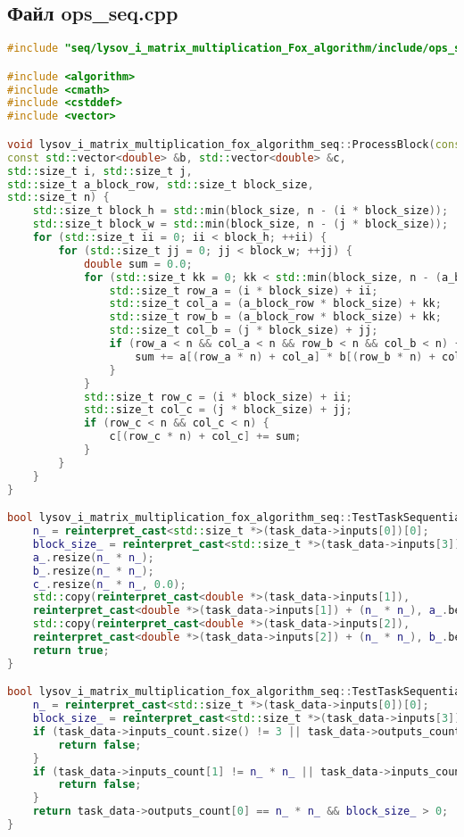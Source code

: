\documentclass[12pt,a4paper]{extarticle}
\begin{document}
\subsection*{Файл ops\_seq.cpp}
\begin{lstlisting}[language=C++]
#include "seq/lysov_i_matrix_multiplication_Fox_algorithm/include/ops_seq.hpp"

#include <algorithm>
#include <cmath>
#include <cstddef>
#include <vector>

void lysov_i_matrix_multiplication_fox_algorithm_seq::ProcessBlock(const std::vector<double> &a,
const std::vector<double> &b, std::vector<double> &c,
std::size_t i, std::size_t j,
std::size_t a_block_row, std::size_t block_size,
std::size_t n) {
	std::size_t block_h = std::min(block_size, n - (i * block_size));
	std::size_t block_w = std::min(block_size, n - (j * block_size));
	for (std::size_t ii = 0; ii < block_h; ++ii) {
		for (std::size_t jj = 0; jj < block_w; ++jj) {
			double sum = 0.0;
			for (std::size_t kk = 0; kk < std::min(block_size, n - (a_block_row * block_size)); ++kk) {
				std::size_t row_a = (i * block_size) + ii;
				std::size_t col_a = (a_block_row * block_size) + kk;
				std::size_t row_b = (a_block_row * block_size) + kk;
				std::size_t col_b = (j * block_size) + jj;
				if (row_a < n && col_a < n && row_b < n && col_b < n) {
					sum += a[(row_a * n) + col_a] * b[(row_b * n) + col_b];
				}
			}
			std::size_t row_c = (i * block_size) + ii;
			std::size_t col_c = (j * block_size) + jj;
			if (row_c < n && col_c < n) {
				c[(row_c * n) + col_c] += sum;
			}
		}
	}
}

bool lysov_i_matrix_multiplication_fox_algorithm_seq::TestTaskSequential::PreProcessingImpl() {
	n_ = reinterpret_cast<std::size_t *>(task_data->inputs[0])[0];
	block_size_ = reinterpret_cast<std::size_t *>(task_data->inputs[3])[0];
	a_.resize(n_ * n_);
	b_.resize(n_ * n_);
	c_.resize(n_ * n_, 0.0);
	std::copy(reinterpret_cast<double *>(task_data->inputs[1]),
	reinterpret_cast<double *>(task_data->inputs[1]) + (n_ * n_), a_.begin());
	std::copy(reinterpret_cast<double *>(task_data->inputs[2]),
	reinterpret_cast<double *>(task_data->inputs[2]) + (n_ * n_), b_.begin());
	return true;
}

bool lysov_i_matrix_multiplication_fox_algorithm_seq::TestTaskSequential::ValidationImpl() {
	n_ = reinterpret_cast<std::size_t *>(task_data->inputs[0])[0];
	block_size_ = reinterpret_cast<std::size_t *>(task_data->inputs[3])[0];
	if (task_data->inputs_count.size() != 3 || task_data->outputs_count.size() != 1) {
		return false;
	}
	if (task_data->inputs_count[1] != n_ * n_ || task_data->inputs_count[0] != n_ * n_) {
		return false;
	}
	return task_data->outputs_count[0] == n_ * n_ && block_size_ > 0;
}


\end{lstlisting}
\end{document}
